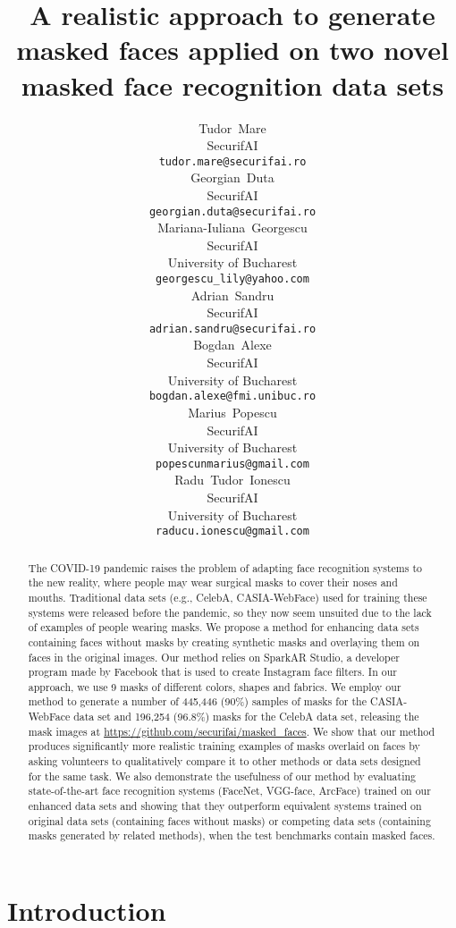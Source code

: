 \documentclass{article}
\title{A realistic approach to generate masked faces applied on two novel masked face recognition data sets}
\author{Tudor~Mare \\
SecurifAI\\
  \texttt{tudor.mare@securifai.ro} \\
\And
  Georgian~Duta\\
  SecurifAI\\
  \texttt{georgian.duta@securifai.ro} \\
  \And
  Mariana-Iuliana~Georgescu \\
  SecurifAI\\
  University of Bucharest\\
  \texttt{georgescu\_lily@yahoo.com} \\
  \And
  Adrian~Sandru \\
  SecurifAI\\
  \texttt{adrian.sandru@securifai.ro} \\
  \And
  Bogdan~Alexe\\
  SecurifAI\\
  University of Bucharest\\
  \texttt{bogdan.alexe@fmi.unibuc.ro} \\
  \And
  Marius~Popescu\\
  SecurifAI\\
  University of Bucharest\\
  \texttt{popescunmarius@gmail.com} \\
  \And
  Radu~Tudor~Ionescu\\
  SecurifAI\\
  University of Bucharest\\
  \texttt{raducu.ionescu@gmail.com} \\
}
\begin{document}
\maketitle

\begin{abstract}
The COVID-19 pandemic raises the problem of adapting face recognition systems to the new reality, where people may wear surgical masks to cover their noses and mouths. Traditional data sets (e.g., CelebA, CASIA-WebFace) used for training these systems were released before the pandemic, so they now seem unsuited due to the lack of examples of people wearing masks. We propose a method for enhancing data sets containing faces without masks by creating synthetic masks and overlaying them on faces in the original images. Our method relies on SparkAR Studio, a developer program made by Facebook that is used to create Instagram face filters. In our approach, we use 9 masks of different colors, shapes and fabrics. We employ our method to generate a number of 445,446 (90\%) samples of masks for the CASIA-WebFace data set and 196,254 (96.8\%) masks for the CelebA data set, releasing the mask images at {\small \url{https://github.com/securifai/masked_faces}}. We show that our method produces significantly more realistic training examples of masks overlaid on faces by asking volunteers to qualitatively compare it to other methods or data sets designed for the same task. We also demonstrate the usefulness of our method by evaluating state-of-the-art face recognition systems (FaceNet, VGG-face, ArcFace) trained on our enhanced data sets and showing that they outperform equivalent systems trained on original data sets (containing faces without masks) or competing data sets (containing masks generated by related methods), when the test benchmarks contain masked faces.
\end{abstract}

\section{Introduction}
\end{document}
